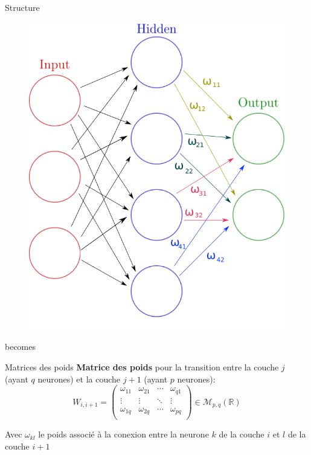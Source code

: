 \documentclass[10pt]{beamer}
\begin{document}
\begin{frame}[fragile]{Structure}
	\begin{figure}
  \includegraphics[scale=0.4]{str2A}
	\centering
	\end{figure}
  \begin{center}becomes\end{center}
\end{frame}

\begin{frame}{Matrices des poids}
	\textbf{Matrice des poids} pour la transition entre la couche $j$ (ayant $q$ neurones) et la couche $j+1$ (ayant $p$ neurones):
	\[W_{i,i+1} = \begin{pmatrix}
		\omega_{11} & \omega_{21} & \cdots & \omega_{q1}\\
		\vdots & \vdots & \ddots & \vdots\\
		\omega_{1q} & \omega_{2q} & \cdots & \omega_{pq}\\
	\end{pmatrix} \in \mathscr{M}_{p,q}(\mathbb{R})\]

	Avec $\omega_{kl}$ le poids associ\'e \`a la conexion entre la neurone $k$ de la couche $i$ et $l$ de la couche $i+1$
\end{frame}
\end{document}
